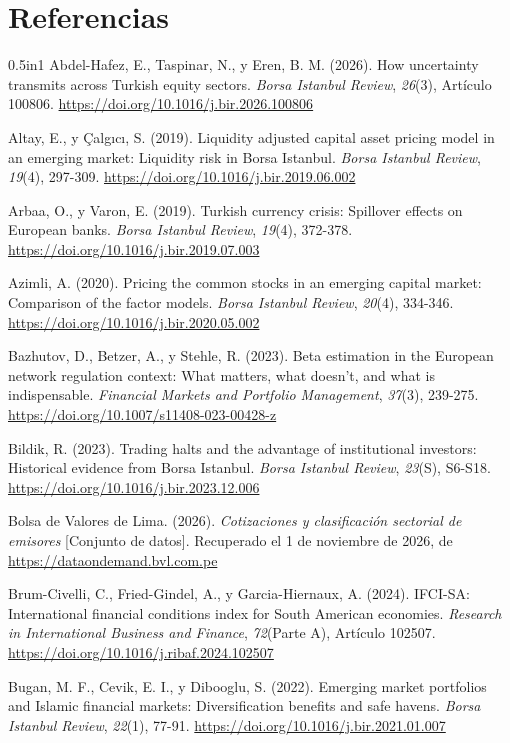 \documentclass[12pt]{article}
\begin{document}
\section{Referencias}
{\singlespacing\small\setlength{\parskip}{0pt}
\begin{hangparas}{0.5in}{1}
Abdel-Hafez, E., Taspinar, N., y Eren, B. M. (2026). How uncertainty transmits across Turkish equity sectors. \textit{Borsa Istanbul Review}, \textit{26}(3), Artículo 100806. \url{https://doi.org/10.1016/j.bir.2026.100806}

Altay, E., y Çalgıcı, S. (2019). Liquidity adjusted capital asset pricing model in an emerging market: Liquidity risk in Borsa Istanbul. \textit{Borsa Istanbul Review}, \textit{19}(4), 297-309. \url{https://doi.org/10.1016/j.bir.2019.06.002}

Arbaa, O., y Varon, E. (2019). Turkish currency crisis: Spillover effects on European banks. \textit{Borsa Istanbul Review}, \textit{19}(4), 372-378. \url{https://doi.org/10.1016/j.bir.2019.07.003}

Azimli, A. (2020). Pricing the common stocks in an emerging capital market: Comparison of the factor models. \textit{Borsa Istanbul Review}, \textit{20}(4), 334-346. \url{https://doi.org/10.1016/j.bir.2020.05.002}

Bazhutov, D., Betzer, A., y Stehle, R. (2023). Beta estimation in the European network regulation context: What matters, what doesn't, and what is indispensable. \textit{Financial Markets and Portfolio Management}, \textit{37}(3), 239-275. \url{https://doi.org/10.1007/s11408-023-00428-z}

Bildik, R. (2023). Trading halts and the advantage of institutional investors: Historical evidence from Borsa Istanbul. \textit{Borsa Istanbul Review}, \textit{23}(S), S6-S18. \url{https://doi.org/10.1016/j.bir.2023.12.006}

Bolsa de Valores de Lima. (2026). \textit{Cotizaciones y clasificación sectorial de emisores} [Conjunto de datos]. Recuperado el 1 de noviembre de 2026, de \url{https://dataondemand.bvl.com.pe}

Brum-Civelli, C., Fried-Gindel, A., y Garcia-Hiernaux, A. (2024). IFCI-SA: International financial conditions index for South American economies. \textit{Research in International Business and Finance}, \textit{72}(Parte A), Artículo 102507. \url{https://doi.org/10.1016/j.ribaf.2024.102507}

Bugan, M. F., Cevik, E. I., y Dibooglu, S. (2022). Emerging market portfolios and Islamic financial markets: Diversification benefits and safe havens. \textit{Borsa Istanbul Review}, \textit{22}(1), 77-91. \url{https://doi.org/10.1016/j.bir.2021.01.007}


\end{hangparas}}
\end{document}
